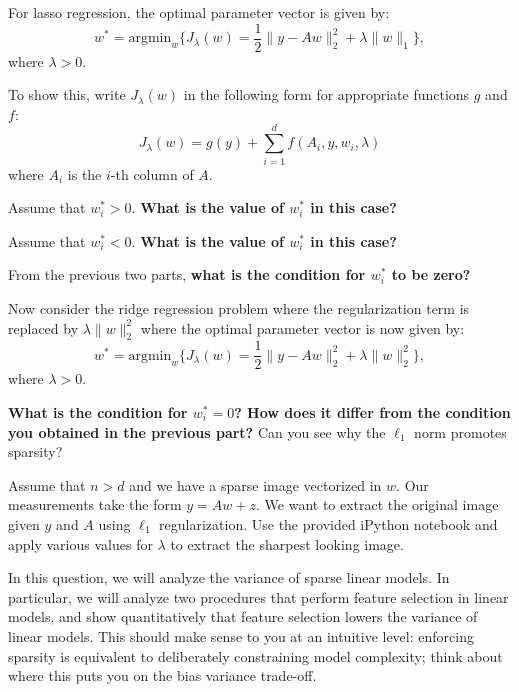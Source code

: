 For lasso regression, the optimal parameter vector is given by:
\[
w^* = \text{argmin}_{w} \{J_{\lambda}(w) = \frac{1}{2} \|{y}- Aw\|_2^2 +\lambda \|w\|_1\},
\]
where $\lambda >0$.
\begin{Parts}
 To show this, write $J_{\lambda}(w)$ in the following form for appropriate functions $g$ and $f$:
\[
J_{\lambda}(w) = g({y}) + \sum_{i=1}^d f(A_i,{y},w_i,\lambda)
\]
where $A_i$ is the $i$-th column of $A$.



\Part Assume that $w_i^* >0$. {\bf What is the value of $w_i^*$ in this case?}


\Part Assume that $w_i^* <0$. {\bf What is the value of $w_i^*$ in this case?}



\Part From the previous two parts, {\bf what is the condition for $w_i^*$ to be zero?}



\Part Now consider the ridge regression problem where the regularization term is replaced by $\lambda\|w\|_2^2$ where the optimal parameter vector is now given by:
\[
w^* = \text{argmin}_{w} \{J_{\lambda}(w) = \frac{1}{2} \|{y}- Aw\|_2^2 +\lambda \|w\|^2_2\},
\]
where $\lambda >0$.

{\bf What is the condition for $w_i^*=0$? How does it differ from the condition you obtained in the previous part?} Can you see why the $\ell_1$ norm promotes sparsity?



\Part Assume that $n > d$ and we have a sparse image vectorized in $w$. Our measurements take the form $y = Aw + z$. We want to extract the original image given $y$ and $A$ using $\ell_1$ regularization. Use the provided iPython notebook and apply various values for $\lambda$ to extract the sharpest looking image.



\end{Parts}

In this question, we will analyze the variance of sparse linear models. In particular, we will analyze two procedures that perform feature selection in linear models, and show quantitatively that feature selection lowers the variance of linear models. This should make sense to you at an intuitive level: enforcing sparsity is equivalent to deliberately constraining model complexity; think about where this puts you on the bias variance trade-off.

